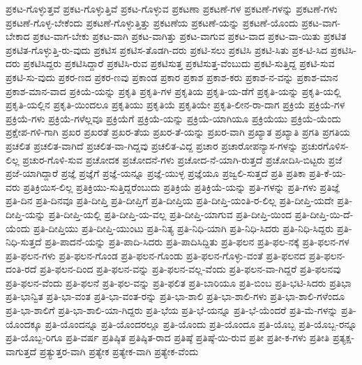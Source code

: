 {ಪ್ರಕಟ-ಗೊಳ್ಳುತ್ತವೆ
ಪ್ರಕಟ-ಗೊಳ್ಳುತ್ತಿವೆ
ಪ್ರಕಟ-ಗೊಳ್ಳುವ
ಪ್ರಕಟಣಾ
ಪ್ರಕಟಣೆ-ಗಳ
ಪ್ರಕಟಣೆ-ಗಳನ್ನು
ಪ್ರಕಟಣೆ-ಗಳು
ಪ್ರಕಟಣೆ-ಗೊಳ್ಳ-ಬೇಕೆಂದು
ಪ್ರಕಟಣೆ-ಗೊಳ್ಳುತ್ತಿತ್ತು
ಪ್ರಕಟಣೆಯ
ಪ್ರಕಟಣೆ-ಯನ್ನು
ಪ್ರಕಟಣೆ-ಯೊಂದು
ಪ್ರಕಟ-ವಾಗ-ಬೇಕಾದ
ಪ್ರಕಟ-ವಾಗ-ಬೇಕು
ಪ್ರಕಟ-ವಾಗಿ
ಪ್ರಕಟ-ವಾಗಿತ್ತು
ಪ್ರಕಟ-ವಾಗುವ
ಪ್ರಕಟ-ವಾದ
ಪ್ರಕಟ-ವಾ-ಯಿತು
ಪ್ರಕಟಿತ
ಪ್ರಕಟಿತ-ಗೊಳ್ಳುತ್ತಿ-ರು-ವುದು
ಪ್ರಕಟಿಸ
ಪ್ರಕಟಿಸ-ತೊಡಗಿ-ದರು
ಪ್ರಕಟಿ-ಸಲು
ಪ್ರಕಟಿಸಿ
ಪ್ರಕಟಿ-ಸಿತು
ಪ್ರಕ-ಟಿ-ಸಿದ
ಪ್ರಕಟಿಸಿ-ದರು
ಪ್ರಕಟಿಸಿದ್ದರು
ಪ್ರಕಟಿಸಿದ್ದಾರೆ
ಪ್ರಕಟಿಸಿ-ರುವ
ಪ್ರಕಟಿಸುತ್ತ
ಪ್ರಕಟಿಸುತ್ತ-ವೆಂಬುದು
ಪ್ರಕಟಿ-ಸುತ್ತಿದ್ದ
ಪ್ರಕಟಿ-ಸುವ
ಪ್ರಕಟಿ-ಸು-ವುದು
ಪ್ರಕರ-ಣದ
ಪ್ರಕರ-ಣವು
ಪ್ರಕಾಂಡ
ಪ್ರಕಾರ
ಪ್ರಕಾಶ
ಪ್ರಕಾಶ-ಕರು
ಪ್ರಕಾಶ-ನ-ವನ್ನು
ಪ್ರಕಾಶ-ಮಾನ
ಪ್ರಕಾಶ-ಮಾನ-ವಾದ
ಪ್ರಕಿಯೆ-ಯನ್ನು
ಪ್ರಕೃತಿ
ಪ್ರಕೃತಿ-ಗಳ
ಪ್ರಕೃತಿಯ
ಪ್ರಕೃತಿ-ಯ-ಡೆಗೆ
ಪ್ರಕೃತಿ-ಯನ್ನು
ಪ್ರಕೃತಿ-ಯಲ್ಲಿ
ಪ್ರಕೃತಿ-ಯಲ್ಲಿನ
ಪ್ರಕೃತಿ-ಯಿಂದಲೂ
ಪ್ರಕೃತಿಯು
ಪ್ರಕೃತಿಯೆ
ಪ್ರಕೃತಿಯೇ
ಪ್ರಕೃತಿ-ಲೀನ-ರಾ-ದಾಗ
ಪ್ರಕ್ರಿಯೆ
ಪ್ರಕ್ರಿಯೆ-ಗಳ
ಪ್ರಕ್ರಿಯೆ-ಗಳು
ಪ್ರಕ್ರಿಯೆ-ಗಳೆಲ್ಲವೂ
ಪ್ರಕ್ರಿಯೆಗೆ
ಪ್ರಕ್ರಿಯೆ-ಯನ್ನು
ಪ್ರಕ್ರಿಯೆ-ಯಾಗಿಯೂ
ಪ್ರಕ್ರಿಯೆಯು
ಪ್ರಕ್ರಿಯೆ-ಯೆಂದು
ಪ್ರಕ್ಷೇಪ-ಗಳಿ-ಗಾಗಿ
ಪ್ರಖರ
ಪ್ರಖರತೆ
ಪ್ರಖರ-ತೆಯ
ಪ್ರಖರ-ತೆ-ಯನ್ನು
ಪ್ರಖರ-ವಾಗಿ
ಪ್ರಖ್ಯಾತ
ಪ್ರಖ್ಯಾತಿ
ಪ್ರಗತಿ
ಪ್ರಗತಿಯ
ಪ್ರಚಲಿತ
ಪ್ರಚಲಿತ-ವಾಗಿದೆ
ಪ್ರಚಲಿತ-ವಾ-ಗಿದ್ದವು
ಪ್ರಚಲಿತ-ವಿದ್ದ
ಪ್ರಚಾರ
ಪ್ರಚಾರೋಪನ್ಯಾಸ-ಗಳನ್ನು
ಪ್ರಚುರಗೊಳಿಸ-ಲಿಲ್ಲ
ಪ್ರಚುರ-ಗೊಳಿ-ಸುವ
ಪ್ರಚೋದಕ
ಪ್ರಚೋದನೆ-ಗಳು
ಪ್ರಚೋದ-ನೆ-ಯಾಗಿ-ರುತ್ತದೆ
ಪ್ರಚೋದಿಸಿ-ಬಿಟ್ಟರು
ಪ್ರಜೆ
ಪ್ರಜೆ-ಯಾಗಿದ್ದಾರೆ
ಪ್ರಜ್ಞೆ
ಪ್ರಜ್ಞೆಗೆ
ಪ್ರಜ್ಞೆ-ಯನ್ನೂ
ಪ್ರಜ್ಞೆ-ಯುಳ್ಳ
ಪ್ರಜ್ಞೆಯೂ
ಪ್ರಜ್ವಲಿ-ಸುತ್ತದೆ
ಪ್ರತಿ
ಪ್ರತಿಕಾ
ಪ್ರತಿ-ಕೆ-ಯ-ವರು
ಪ್ರತಿಕ್ರಿಯಿಸ-ಲಿಲ್ಲ
ಪ್ರತಿಕ್ರಿಯು-ಸುತ್ತಿದ್ದರೆಂಬುದು
ಪ್ರತಿಕ್ರಿಯೆ
ಪ್ರತಿಕ್ರಿಯೆ-ಯನ್ನು
ಪ್ರತಿ-ಗಳನ್ನು
ಪ್ರತಿ-ಗಳು
ಪ್ರತಿಜ್ಞೆ
ಪ್ರತಿ-ದಿನ
ಪ್ರತಿ-ದಿನವೂ
ಪ್ರತಿ-ದೀಪ್ತಿ
ಪ್ರತಿ-ದೀಪ್ತಿಗೆ
ಪ್ರತಿ-ದೀಪ್ತಿಯ
ಪ್ರತಿ-ದೀಪ್ತಿ-ಯಂತಿ-ರ-ಲಿಲ್ಲ
ಪ್ರತಿ-ದೀಪ್ತಿ-ಯದೇ
ಪ್ರತಿ-ದೀಪ್ತಿ-ಯನ್ನು
ಪ್ರತಿ-ದೀಪ್ತಿ-ಯಲ್ಲಿ
ಪ್ರತಿ-ದೀಪ್ತಿ-ಯ-ವಲ್ಲ
ಪ್ರತಿ-ದೀಪ್ತಿ-ಯಾಗುವ
ಪ್ರತಿ-ದೀಪ್ತಿ-ಯಿಂದ
ಪ್ರತಿ-ದೀಪ್ತಿ-ಯಿ-ದೆ-ಯೆಂದು
ಪ್ರತಿ-ದೀಪ್ತಿಯು
ಪ್ರತಿ-ದೀಪ್ತಿ-ಯುಂಟು
ಪ್ರತಿ-ನಿತ್ಯ
ಪ್ರತಿ-ನಿಧಿ-ಯಾಗಿ
ಪ್ರತಿ-ನಿಧಿ-ಸಿದರು
ಪ್ರತಿ-ನಿಧಿ-ಸಿದ್ದರು
ಪ್ರತಿ-ನಿಧಿ-ಸುತ್ತದೆ
ಪ್ರತಿ-ಪಾದನೆ-ಯನ್ನು
ಪ್ರತಿ-ಪಾದಿ-ಸಿದರು
ಪ್ರತಿ-ಪಾದಿಸಿದ್ದಿತು
ಪ್ರತಿ-ಫಲನ
ಪ್ರತಿ-ಫಲ-ನಕ್ಕೆ
ಪ್ರತಿ-ಫಲನ-ಗಳ
ಪ್ರತಿ-ಫಲನ-ಗಳು
ಪ್ರತಿ-ಫಲನ-ಗೊಂಡ
ಪ್ರತಿ-ಫಲನ-ಗೊಂಡು
ಪ್ರತಿ-ಫಲನ-ಗೊಳ್ಳು-ವಂತೆ
ಪ್ರತಿ-ಫಲನದ
ಪ್ರತಿ-ಫಲನ-ದಂತಿ-ರದೆ
ಪ್ರತಿ-ಫಲನ-ದಿಂದ
ಪ್ರತಿ-ಫಲನ-ವನ್ನು
ಪ್ರತಿ-ಫಲನ-ವಲ್ಲ-ವೆಂದು
ಪ್ರತಿ-ಫಲನ-ವಾ-ಗಿದ್ದರೆ
ಪ್ರತಿ-ಫಲನವು
ಪ್ರತಿ-ಫಲನ-ವೆಂದು
ಪ್ರತಿ-ಫಲನೆ
ಪ್ರತಿ-ಫಲ-ವನ್ನು
ಪ್ರತಿ-ಫಲಿತ
ಪ್ರತಿ-ಬಾರಿಯೂ
ಪ್ರತಿ-ಬಿಂಬ
ಪ್ರತಿ-ಭಟಿ-ಸಿದರು
ಪ್ರತಿಭಾ
ಪ್ರತಿ-ಭಾನ್ವಿತ
ಪ್ರತಿ-ಭಾ-ವಂತ
ಪ್ರತಿ-ಭಾ-ವಂತ-ರನ್ನು
ಪ್ರತಿ-ಭಾ-ಶಾಲಿ
ಪ್ರತಿ-ಭಾ-ಶಾಲಿ-ಗಳು
ಪ್ರತಿ-ಭಾ-ಶಾಲಿ-ಗಳೆಂದೂ
ಪ್ರತಿ-ಭಾ-ಶಾಲಿಗೆ
ಪ್ರತಿ-ಭಾ-ಶಾಲಿ-ಯಾ-ಗಿದ್ದರು
ಪ್ರತಿ-ಭೆಯ
ಪ್ರತಿ-ಭೆ-ಯನ್ನೂ
ಪ್ರತಿ-ಭೆ-ಯೆಂದರೆ
ಪ್ರತಿ-ಮೆ-ಗಳನ್ನು
ಪ್ರತಿ-ಯೊಂದಕ್ಕೂ
ಪ್ರತಿ-ಯೊಂದನ್ನೂ
ಪ್ರತಿ-ಯೊಂದರಲ್ಲೂ
ಪ್ರತಿ-ಯೊಂದು
ಪ್ರತಿ-ಯೊಂದೂ
ಪ್ರತಿ-ಯೊಬ್ಬ
ಪ್ರತಿ-ಯೊಬ್ಬ-ರನ್ನೂ
ಪ್ರತಿ-ಯೊಬ್ಬ-ರಿಗೂ
ಪ್ರತಿ-ವರ್ಷ
ಪ್ರತಿಷ್ಠಿತ
ಪ್ರತಿಷ್ಠಿತ-ರಾದ
ಪ್ರತಿಷ್ಠೆ
ಪ್ರತಿಷ್ಠೆ-ಯಿ-ರುವ
ಪ್ರತೀ
ಪ್ರತೀ-ಕ-ಗಳು
ಪ್ರತೀತಿ
ಪ್ರತ್ಯಕ್ಷ-ವಾಗುತ್ತದೆ
ಪ್ರತ್ಯುತ್ತರ-ವಾಗಿ
ಪ್ರತ್ಯೇಕ
ಪ್ರತ್ಯೇಕ-ವಾಗಿ
ಪ್ರತ್ಯೇಕ-ವೆಂದು
}
